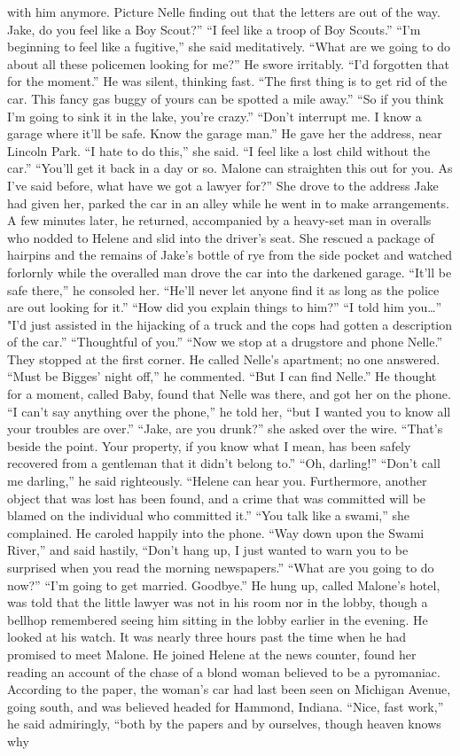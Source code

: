 \documentclass{novel}
\begin{document}
with him anymore. Picture Nelle finding out that the letters are out of the way. Jake, do you feel like a Boy Scout?” “I feel like a troop of Boy Scouts.” “I’m beginning to feel like a fugitive,” she said meditatively. “What are we going to do about all these policemen looking for me?” He swore irritably. “I’d forgotten that for the moment.” He was silent, thinking fast. “The first thing is to get rid of the car. This fancy gas buggy of yours can be spotted a mile away.” “So if you think I’m going to sink it in the lake, you’re crazy.” “Don’t interrupt me. I know a garage where it’ll be safe. Know the garage man.” He gave her the address, near Lincoln Park. “I hate to do this,” she said. “I feel like a lost child without the car.” “You’ll get it back in a day or so. Malone can straighten this out for you. As I’ve said before, what have we got a lawyer for?” She drove to the address Jake had given her, parked the car in an alley while he went in to make arrangements. A few minutes later, he returned, accompanied by a heavy-set man in overalls who nodded to Helene and slid into the driver’s seat. She rescued a package of hairpins and the remains of Jake’s bottle of rye from the side pocket and watched forlornly while the overalled man drove the car into the darkened garage. “It’ll be safe there,” he consoled her. “He’ll never let anyone find it as long as the police are out looking for it.” “How did you explain things to him?” “I told him you…” "I'd just assisted in the hijacking of a truck and the cops had gotten a description of the car.” “Thoughtful of you.” “Now we stop at a drugstore and phone Nelle.” They stopped at the first corner. He called Nelle’s apartment; no one answered. “Must be Bigges’ night off,” he commented. “But I can find Nelle.” He thought for a moment, called Baby, found that Nelle was there, and got her on the phone. “I can’t say anything over the phone,” he told her, “but I wanted you to know all your troubles are over.” “Jake, are you drunk?” she asked over the wire. “That’s beside the point. Your property, if you know what I mean, has been safely recovered from a gentleman that it didn’t belong to.” “Oh, darling!” “Don’t call me darling,” he said righteously. “Helene can hear you. Furthermore, another object that was lost has been found, and a crime that was committed will be blamed on the individual who committed it.” “You talk like a swami,” she complained. He caroled happily into the phone. “Way down upon the Swami River,” and said hastily, “Don’t hang up, I just wanted to warn you to be surprised when you read the morning newspapers.” “What are you going to do now?” “I’m going to get married. Goodbye.” He hung up, called Malone’s hotel, was told that the little lawyer was not in his room nor in the lobby, though a bellhop remembered seeing him sitting in the lobby earlier in the evening. He looked at his watch. It was nearly three hours past the time when he had promised to meet Malone. He joined Helene at the news counter, found her reading an account of the chase of a blond woman believed to be a pyromaniac. According to the paper, the woman’s car had last been seen on Michigan Avenue, going south, and was believed headed for Hammond, Indiana. “Nice, fast work,” he said admiringly, “both by the papers and by ourselves, though heaven knows why 
\end{document}
